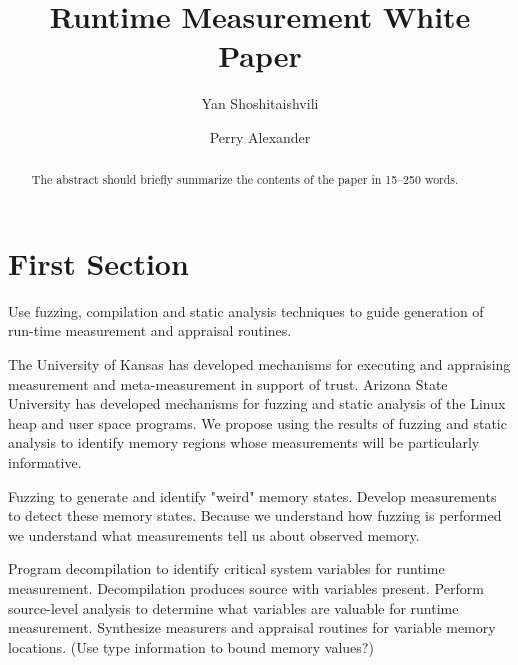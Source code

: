 \documentclass[runningheads]{llncs}
\begin{document}
%
\title{Runtime Measurement White Paper}
%
%
\author{Yan Shoshitaishvili \and Perry Alexander}
%
%
%
\maketitle              %
%
\begin{abstract}
The abstract should briefly summarize the contents of the paper in
15--250 words.

\end{abstract}
%
%
%
\section{First Section}

Use fuzzing, compilation and static analysis techniques to guide generation of run-time measurement and appraisal routines.

The University of Kansas has developed mechanisms for executing and appraising measurement and meta-measurement in support of trust.  Arizona State University has developed mechanisms for fuzzing and static analysis of the Linux heap and user space programs.  We propose using the results of fuzzing and static analysis to identify memory regions whose measurements will be particularly informative.

Fuzzing to generate and identify "weird" memory states.  Develop measurements to detect these memory states.  Because we understand how fuzzing is performed we understand what measurements tell us about observed memory.

Program decompilation to identify critical system variables for runtime measurement.  Decompilation produces source with variables present.  Perform source-level analysis to determine what variables are valuable for runtime measurement.  Synthesize measurers and appraisal routines for variable memory locations.  (Use type information to bound memory values?)
\end{document}

